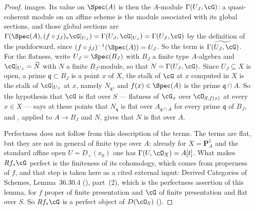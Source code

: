 \begin{proof}
images.  Its value on $\Spec(A)$ is then the $A$-module
$\Gamma(U_J,\cG)$: a quasi-coherent module on an affine scheme is the
module associated with its global sections, and those global sections
are
$\Gamma(\Spec(A),(f\circ j_J)_*\cG|_{U_J})=\Gamma(U_J,\cG|_{U_J})
=\Gamma(U_J,\cG)$
by the definition of the pushforward, since
$(f\circ j_J)^{-1}(\Spec(A))=U_J$.  So the term is
$\widetilde{\Gamma(U_J,\cG)}$.  For the
flatness, write $U_J=\Spec(B_J)$ with $B_J$ a finite type $A$-algebra
and $\cG|_{U_J}=\widetilde N$ with $N$ a finite $B_J$-module, so that
$N=\Gamma(U_J,\cG)$.  Since $U_J\subseteq X$ is open, a prime
$\mathfrak q\subset B_J$ is a point $x$ of $X$, the stalk of $\cG$ at
$x$ computed in $X$ is the stalk of $\cG|_{U_J}$ at $x$, namely
$N_{\mathfrak q}$, and $f(x)\in\Spec(A)$ is the prime
$\mathfrak q\cap A$.  So the hypothesis that $\cG$ is flat over $S$ ---
flatness of $\cG_x$ over $\cO_{S,f(x)}$ at every $x\in X$ --- says at
these points that $N_{\mathfrak q}$ is flat over $A_{\mathfrak q\cap A}$
for every prime $\mathfrak q$ of $B_J$, and
, applied to $A\to B_J$ and $N$, gives
that $N$ is flat over $A$.

Perfectness does not follow from this description of the terms.  The
terms are flat, but they are not in general of finite type over $A$:
already for $X=\mathbf P^1_A$ and the standard affine open
$U=D_+(x_0)$ one has $\Gamma(U,\cO_X)=A[t]$.  What makes $Rf_*\cG$
perfect is the finiteness of its cohomology, which comes from
properness of $f$, and that step is taken here as a cited external
input: Derived Categories of Schemes, Lemma~36.30.4
(), part~(2), which is the perfectness assertion
of this lemma, for $f$ proper of finite presentation and $\cG$ of
finite presentation and flat over $S$.  So $Rf_*\cG$ is a perfect
object of $D(\cO_S)$ ().


\end{proof}
